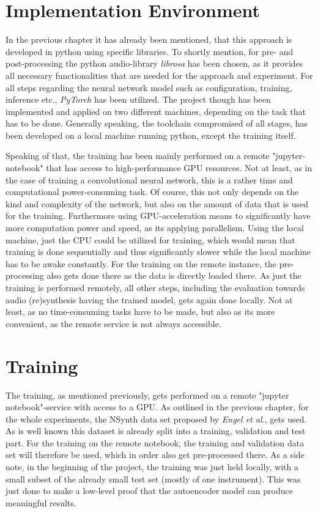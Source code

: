 \section{Implementation Environment}
In the previous chapter it has already been mentioned, that this approach is developed in python using specific libraries. To shortly mention, for pre- and post-processing the python audio-library \textit{librosa}\cite{brian_mcfee_2022_6097378} has been chosen, as it provides all necessary functionalities that are needed for the approach and experiment. For all steps regarding the neural network model such as configuration, training, inference etc., \textit{PyTorch}\cite{paszke2019pytorch} has been utilized. The project though has been implemented and applied on two different machines, depending on the task that has to be done. Generally speaking, the toolchain compromised of all stages, has been developed on a local machine running python, except the training itself. 

Speaking of that, the training has been mainly performed on a remote "jupyter-notebook" that has access to high-performance GPU resources. Not at least, as in the case of training a convolutional neural network, this is a rather time and computational power-consuming task. Of course, this not only depends on the kind and complexity of the network, but also on the amount of data that is used for the training. Furthermore using GPU-acceleration means to significantly have more computation power and speed, as its applying parallelism. Using the local machine, just the CPU could be utilized for training, which would mean that training is done sequentially and thus significantly slower while the local machine has to be awake constantly. For the training on the remote instance, the pre-processing also gets done there as the data is directly loaded there. 
As just the training is performed remotely, all other steps, including the evaluation towards audio (re)synthesis having the trained model, gets again done locally. Not at least, as no time-consuming tasks have to be made, but also as its more convenient, as the remote service is not always accessible.


\section{Training}
The training, as mentioned previously, gets performed on a remote "jupyter notebook"-service with access to a GPU. As outlined in the previous chapter, for the whole experiments, the NSynth data set proposed by \textit{Engel et al.}\cite{Engel2017}, gets used. As is well known this dataset is already split into a training, validation and test part. For the training on the remote notebook, the training and validation data set will therefore be used, which in order also get pre-processed there. As a side note, in the beginning of the project, the training was just held locally, with a small subset of the already small test set (mostly of one instrument). This was just done to make a low-level proof that the autoencoder model can produce meaningful results. 

